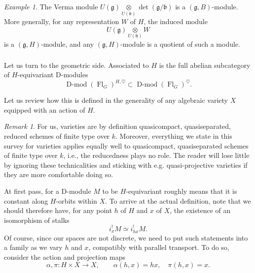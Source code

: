 \documentclass[10pt]{amsart}
\newcommand{\sB}{\on{Fl}_G}
\newcommand{\fg}{\mathfrak{g}}
\newcommand{\fh}{\mathfrak{h}}
\newcommand{\on}{\operatorname}
\newcommand{\Dmod}{\on{D-mod}}
\theoremstyle{remark}
\newtheorem{re}[subsubsection]{Remark}
\newtheorem{ex}[subsubsection]{Example}
\newcommand{\fb}{\mathfrak{b}}
\numberwithin{equation}{section}
\begin{document}
	
	\begin{ex} The Verma module $U(\fg) \underset{U(\fb)} \otimes 
	\det(\fg/\fb)$ is 
		a $(\fg,B)$-module. More generally, for any representation $W$ of $H$, 
		the 
		induced module 
		\[
		U(\fg) \underset{U(\fh)} \otimes W
		\]
		is a $(\fg,H)$-module, and any $(\fg, H)$-module is a quotient of such 
		a 
		module.  
	\end{ex}
	
	
	
	
	
	\subsubsection{} \label{s:eqdmod}Let us turn to the geometric side. 
	Associated to $H$ is 
	the 
	full abelian subcategory of $H$-equivariant D-modules 
	\[
	\Dmod(\sB)^{H, \heartsuit} \subset \Dmod(\sB)^\heartsuit.
	\]
	
	Let us review how this is defined in the generality of any algebraic 
	variety 
	$X$ equipped with an action of $H$. 
	
	\begin{re} For us, varieties are by definition quasicompact, quasiseparated, reduced schemes of finite type over $k$. Moreover, everything we state in this survey for varieties applies equally well to quasicompact, quasiseparated schemes of finite type over $k$, i.e., the reducedness plays no role.	The reader will lose little by ignoring these technicalities and sticking with e.g. quasi-projective varieties if they are more comfortable doing so. 
	\end{re}
	
	
	
	At first pass, for a D-module $M$ to 
	be 
	$H$-equivariant roughly means that it is constant along $H$-orbits within 
	$X$. To arrive at the actual definition, note that we should therefore 
	have, 
	for any 
	point $h$ of $H$ and $x$ of $X$, 
	the existence of an isomorphism of stalks
	\begin{equation}\label{e:stalks}
	i_x^! M \simeq i_{hx}^! M.
	\end{equation}
	Of course, since our spaces are not discrete, we need to put such 
	statements 
	into a family as we vary $h$ and $x$, compatibly with parallel transport. 
	To do 
	so, consider the 
	action and projection maps 
	\begin{equation}
	\alpha, \pi: H \times X \rightarrow X,\quad  \quad \alpha(h, x) = hx, 
	\quad 
	\pi(h, x) = x. 
	\end{equation}
	
\end{document}
